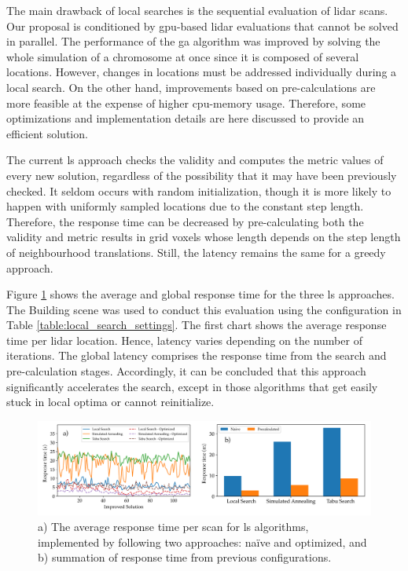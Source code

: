 The main drawback of local searches is the sequential evaluation of \acrshort{lidar} scans. Our proposal is conditioned by \acrshort{gpu}-based \acrshort{lidar} evaluations that cannot be solved in parallel. The performance of the \acrshort{ga} algorithm was improved by solving the whole simulation of a chromosome at once since it is composed of several locations. However, changes in locations must be addressed individually during a local search. On the other hand, improvements based on pre-calculations are more feasible at the expense of higher \acrshort{cpu}-memory usage. Therefore, some optimizations and implementation details are here discussed to provide an efficient solution.

The current \acrshort{ls} approach checks the validity and computes the metric values of every new solution, regardless of the possibility that it may have been previously checked. It seldom occurs with random initialization, though it is more likely to happen with uniformly sampled locations due to the constant step length. Therefore, the response time can be decreased by pre-calculating both the validity and metric results in grid voxels whose length depends on the step length of neighbourhood translations. Still, the latency remains the same for a greedy approach. 

Figure \ref{fig:local_search_response_time} shows the average and global response time for the three \acrshort{ls} approaches. The Building scene was used to conduct this evaluation using the configuration in Table \ref{table:local_search_settings}. The first chart shows the average response time per \acrshort{lidar} location. Hence, latency varies depending on the number of iterations. The global latency comprises the response time from the search and pre-calculation stages. Accordingly, it can be concluded that this approach significantly accelerates the search, except in those algorithms that get easily stuck in local optima or cannot reinitialize. 

\begin{figure}
    \centering
    \includegraphics[width=\linewidth]{figs/lidar_optimization/response_time_results.png}
	\caption{a) The average response time per scan for \acrshort{ls} algorithms, implemented by following two approaches: naïve and optimized, and b) summation of response time from previous configurations. }
	\label{fig:local_search_response_time}
\end{figure}

